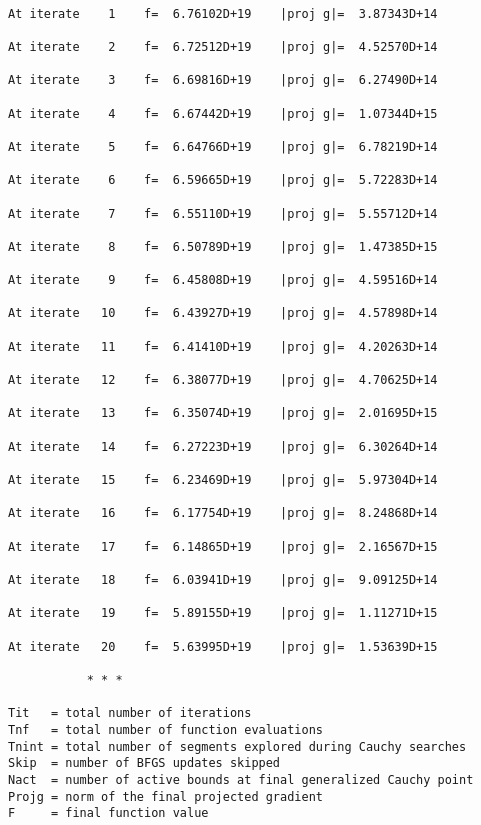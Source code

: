 \documentclass[11pt]{article}
\begin{document}
    \begin{Verbatim}[commandchars=\\\{\}]

At iterate    1    f=  6.76102D+19    |proj g|=  3.87343D+14

At iterate    2    f=  6.72512D+19    |proj g|=  4.52570D+14

At iterate    3    f=  6.69816D+19    |proj g|=  6.27490D+14

At iterate    4    f=  6.67442D+19    |proj g|=  1.07344D+15

At iterate    5    f=  6.64766D+19    |proj g|=  6.78219D+14

At iterate    6    f=  6.59665D+19    |proj g|=  5.72283D+14

At iterate    7    f=  6.55110D+19    |proj g|=  5.55712D+14

At iterate    8    f=  6.50789D+19    |proj g|=  1.47385D+15

At iterate    9    f=  6.45808D+19    |proj g|=  4.59516D+14

At iterate   10    f=  6.43927D+19    |proj g|=  4.57898D+14

At iterate   11    f=  6.41410D+19    |proj g|=  4.20263D+14

At iterate   12    f=  6.38077D+19    |proj g|=  4.70625D+14

At iterate   13    f=  6.35074D+19    |proj g|=  2.01695D+15

At iterate   14    f=  6.27223D+19    |proj g|=  6.30264D+14

At iterate   15    f=  6.23469D+19    |proj g|=  5.97304D+14

At iterate   16    f=  6.17754D+19    |proj g|=  8.24868D+14

At iterate   17    f=  6.14865D+19    |proj g|=  2.16567D+15

At iterate   18    f=  6.03941D+19    |proj g|=  9.09125D+14

At iterate   19    f=  5.89155D+19    |proj g|=  1.11271D+15

At iterate   20    f=  5.63995D+19    |proj g|=  1.53639D+15

           * * *

Tit   = total number of iterations
Tnf   = total number of function evaluations
Tnint = total number of segments explored during Cauchy searches
Skip  = number of BFGS updates skipped
Nact  = number of active bounds at final generalized Cauchy point
Projg = norm of the final projected gradient
F     = final function value


\end{Verbatim}
\end{document}
